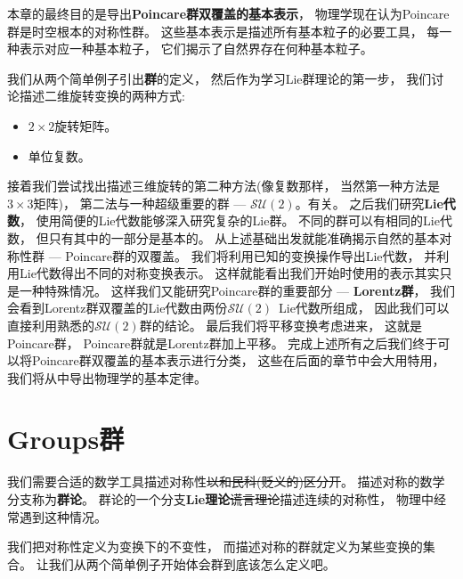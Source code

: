 本章的最终目的是导出{\bf{Poincare群双覆盖的基本表示}}， 物理学现在认为Poincare群是时空根本的对称性群。 这些基本表示是描述所有基本粒子的必要工具， 每一种表示对应一种基本粒子， 它们揭示了自然界存在何种基本粒子。

我们从两个简单例子引出{\bf{群}}的定义， 然后作为学习Lie群理论的第一步， 我们讨论描述二维旋转变换的两种方式:
\begin{itemize}
	\item $2 \times 2$旋转矩阵。
	\item 单位复数。
\end{itemize}

接着我们尝试找出描述三维旋转的第二种方法(像复数那样， 当然第一种方法是$3\times3$矩阵)， 第二法与一种超级重要的群 --- {\bf{$\mathcal{SU}(2)$}}。有关。 之后我们研究{\bf{Lie代数}}， 使用简便的Lie代数能够深入研究复杂的Lie群。 不同的群可以有相同的Lie代数， 但只有其中的一部分是基本的。 
从上述基础出发就能准确揭示自然的基本对称性群 --- Poincare群的双覆盖。 
我们将利用已知的变换操作导出Lie代数， 并利用Lie代数得出不同的对称变换表示。 这样就能看出我们开始时使用的表示其实只是一种特殊情况。 这样我们又能研究Poincare群的重要部分 --- {\bf{Lorentz群}}， 我们会看到Lorentz群双覆盖的Lie代数由两份$\mathcal{SU}(2)$\, Lie代数所组成， 因此我们可以直接利用熟悉的$\mathcal{SU}(2)$群的结论。 最后我们将平移变换考虑进来， 这就是Poincare群， Poincare群就是Lorentz群加上平移。 完成上述所有之后我们终于可以将Poincare群双覆盖的基本表示进行分类， 这些在后面的章节中会大用特用， 我们将从中导出物理学的基本定律。

\section[群]{Groups\quad 群}
\label{sec3.1}
我们需要合适的数学工具描述对称性\sout{以和民科(贬义的)区分开}。 描述对称的数学分支称为{\bf{群论}}。 群论的一个分支{\bf{Lie理论}}\sout{谎言理论}描述连续的对称性， 物理中经常遇到这种情况。

我们把对称性定义为变换下的不变性， 而描述对称的群就定义为某些变换的集合。 让我们从两个简单例子开始体会群到底该怎么定义吧。



